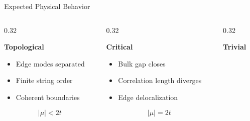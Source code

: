 \documentclass[aspectratio=169, 12pt]{beamer}
\begin{document}


\begin{frame}{Expected Physical Behavior}

\centering

\begin{columns}[T]

\begin{column}{0.32\textwidth}

\centering
\textbf{Topological}

\vspace{0.2cm}

\begin{itemize}\footnotesize
  \item Edge modes separated
  \item Finite string order
  \item Coherent boundaries
\end{itemize}

\vspace{0.2cm}

\[
|\mu| < 2t
\]

\end{column}

\begin{column}{0.32\textwidth}

\centering
\textbf{Critical}

\vspace{0.2cm}

\begin{itemize}\footnotesize
  \item Bulk gap closes
  \item Correlation length diverges
  \item Edge delocalization
\end{itemize}

\vspace{0.2cm}

\[
|\mu| = 2t
\]

\end{column}

\begin{column}{0.32\textwidth}

\centering
\textbf{Trivial}


\end{column}
\end{columns}
\end{frame}
\end{document}
